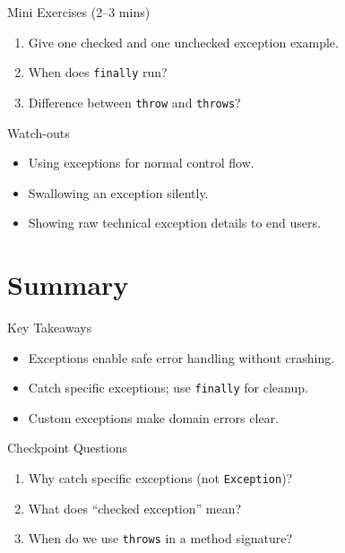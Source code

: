 \documentclass{beamer}
\begin{document}
\begin{frame}{Mini Exercises (2--3 mins)}
  \begin{enumerate}[<+->]
    \item Give one checked and one unchecked exception example.
    \item When does \texttt{finally} run?
    \item Difference between \texttt{throw} and \texttt{throws}?
  \end{enumerate}
  \slidesources{\OOPSUnitIIISources}
\end{frame}

\begin{frame}{Watch-outs}
\begin{itemize}[<+->]
  \item Using exceptions for normal control flow.
  \item Swallowing an exception silently.
  \item Showing raw technical exception details to end users.
\end{itemize}
  \slidesources{\OOPSUnitIIISources}
\end{frame}

\section{Summary}
\label{sec:summary}

\begin{frame}{Key Takeaways}
  \begin{itemize}[<+->]
    \item Exceptions enable safe error handling without crashing.
    \item Catch specific exceptions; use \texttt{finally} for cleanup.
    \item Custom exceptions make domain errors clear.
  \end{itemize}
  \slidesources{\OOPSUnitIIISources}
\end{frame}

\begin{frame}{Checkpoint Questions}
  \begin{enumerate}[<+->]
    \item Why catch specific exceptions (not \texttt{Exception})?
    \item What does ``checked exception'' mean?
    \item When do we use \texttt{throws} in a method signature?
  \end{enumerate}
  \slidesources{\OOPSUnitIIISources}
\end{frame}
\end{document}

